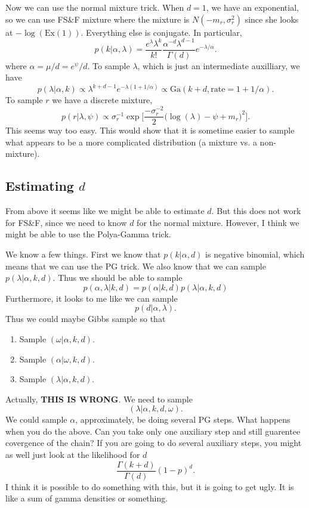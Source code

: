 \documentclass{article}
\begin{document}
Now we can use the normal mixture trick.  When $d=1$, we have an exponential, so
we can use FS\&F mixture where the mixture is $N(-m_r, \sigma_r^2)$ since she
looks at $-\log(\text{Ex}(1))$.  Everything else is conjugate.  In particular,
\[
p(k | \alpha, \lambda) = \frac{e^\lambda \lambda^k}{k!} 
\frac{\alpha^{-d} \lambda^{d-1}}{\Gamma(d)} e^{-\lambda / \alpha}.
\]
where $\alpha = \mu / d = e^\psi / d$.  To sample $\lambda$, which is just an
intermediate auxilliary, we have
\[
p(\lambda | \alpha, k) \propto \lambda^{k+d-1} e^{-\lambda (1+1/\alpha)} \propto
\text{Ga}(k+d, \text{rate}=1+1/\alpha).
\]
To sample $r$ we have a discrete mixture,
\[
p(r|\lambda, \psi) \propto \sigma_{r}^{-1} \exp 
\Big[ \frac{-\sigma_r^{-2}}{2} \Big(\log(\lambda) - \psi + m_r \Big)^2 \Big].
\]
This seems way too easy.  This would show that it is sometime easier to sample
what appears to be a more complicated distribution (a mixture vs. a non-mixture).

\subsection*{Estimating $d$}

From above it seems like we might be able to estimate $d$.  But this does not
work for FS\&F, since we need to know $d$ for the normal mixture.  However, I
think we might be able to use the Polya-Gamma trick. 

We know a few things.  First we know that $p(k | \alpha, d)$ is negative
binomial, which means that we can use the PG trick.  We also know that we can
sample $p(\lambda | \alpha, k, d)$.  Thus we should be able to sample
\[
p(\alpha, \lambda | k, d) =  p(\alpha | k, d) p(\lambda | \alpha, k, d)
\]
Furthermore, it looks to me like we can sample
\[
p(d | \alpha, \lambda).
\]
Thus we could maybe Gibbs sample so that
\begin{enumerate}
\item Sample $(\omega | \alpha, k, d)$.
\item Sample $(\alpha | \omega, k, d)$.
\item Sample $(\lambda | \alpha, k, d)$.
\end{enumerate}
Actually, \textbf{THIS IS WRONG}.  We need to sample
\[
(\lambda | \alpha, k, d, \omega).
\]
We could sample $\alpha$, approximately, be doing several PG steps.  What
happens when you do the above.  Can you take only one auxiliary step and still
guarentee covergence of the chain?  If you are going to do several auxiliary
steps, you might as well just look at the likelihood for $d$
\[
\frac{\Gamma(k+d)}{\Gamma(d)} (1-p)^d.
\]
I think it is possible to do something with this, but it is going to get ugly.
It is like a sum of gamma densities or something.
\end{document}
